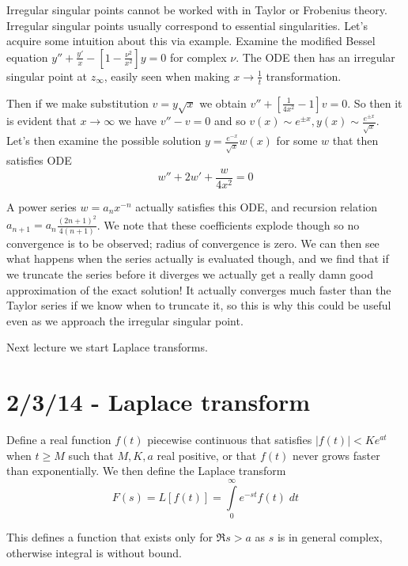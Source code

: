 \documentclass[10pt]{report}
\newcommand{\abs}[1]{\left|#1\right|}
\begin{document}
Irregular singular points cannot be worked with in Taylor or Frobenius theory. Irregular singular points usually correspond to essential singularities. Let's acquire some intuition about this via example. Examine the modified Bessel equation $y'' + \frac{y'}{x} - \left[ 1 - \frac{\nu^2}{x^2} \right]y = 0$ for complex $\nu$. The ODE then has an irregular singular point at $z_\infty$, easily seen when making $x \to \frac{1}{t}$ transformation. 

Then if we make substitution $v = y\sqrt{x}$ we obtain $v'' + \left[ \frac{1}{4x^2}-1 \right]v = 0$. So then it is evident that $x\to \infty$ we have $v'' - v = 0$ and so $v(x) \sim e^{\pm x}, y(x) \sim \frac{e^{\pm x}}{\sqrt{x}}$. Let's then examine the possible solution $y = \frac{e^{-x}}{\sqrt{x}}w(x)$ for some $w$ that then satisfies ODE
\begin{equation}
    w'' + 2w' + \frac{w}{4x^2} = 0
\end{equation}

A power series $w = a_n x^{-n}$ actually satisfies this ODE, and recursion relation $a_{n+1} = a_n\frac{(2n+1)^2}{4(n+1)}$. We note that these coefficients explode though so no convergence is to be observed; radius of convergence is zero. We can then see what happens when the series actually is evaluated though, and we find that if we truncate the series before it diverges we actually get a really damn good approximation of the exact solution! It actually converges much faster than the Taylor series if we know when to truncate it, so this is why this could be useful even as we approach the irregular singular point.

Next lecture we start Laplace transforms.
\chapter{2/3/14 - Laplace transform}

Define a real function $f(t)$ piecewise continuous that satisfies $\abs{f(t)} < Ke^{at}$ when $t \geq M$ such that $M, K, a$ real positive, or that $f(t)$ never grows faster than exponentially. We then define the Laplace transform
\begin{equation}
    F(s) = L[f(t)] = \displaystyle\int\limits_{0}^{\infty}e^{-st}f(t)\;dt
    \label{2.3.Laplace}
\end{equation}

This defines a function that exists only for $\Re s > a$ as $s$ is in general complex, otherwise integral is without bound.
\end{document}
